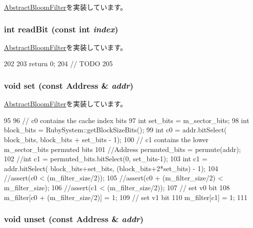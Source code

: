 \hyperlink{classAbstractBloomFilter_a3ea5f7af5db62cc24f4e40df9ea5c971}{AbstractBloomFilter}を実装しています。\hypertarget{classBulkBloomFilter_a6f8a98d0f38a8d122d4cbf87323484eb}{
\subsubsection[{readBit}]{\setlength{\rightskip}{0pt plus 5cm}int readBit (const int {\em index})}}
\label{classBulkBloomFilter_a6f8a98d0f38a8d122d4cbf87323484eb}


\hyperlink{classAbstractBloomFilter_a6c0e9a098f0f210aa42eb2f1553804eb}{AbstractBloomFilter}を実装しています。


\begin{DoxyCode}
202 {
203     return 0;
204     // TODO
205 }
\end{DoxyCode}
\hypertarget{classBulkBloomFilter_a2b666fae2a5c2b98bc5cba8e1333bcc9}{
\subsubsection[{set}]{\setlength{\rightskip}{0pt plus 5cm}void set (const {\bf Address} \& {\em addr})}}
\label{classBulkBloomFilter_a2b666fae2a5c2b98bc5cba8e1333bcc9}


\hyperlink{classAbstractBloomFilter_a54e1262ae5f60efeb8714d0556b3c32e}{AbstractBloomFilter}を実装しています。


\begin{DoxyCode}
95 {
96     // c0 contains the cache index bits
97     int set_bits = m_sector_bits;
98     int block_bits = RubySystem::getBlockSizeBits();
99     int c0 = addr.bitSelect( block_bits, block_bits + set_bits - 1);
100     // c1 contains the lower m_sector_bits permuted bits
101     //Address permuted_bits = permute(addr);
102     //int c1 = permuted_bits.bitSelect(0, set_bits-1);
103     int c1 = addr.bitSelect( block_bits+set_bits, (block_bits+2*set_bits) - 1);
104     //assert(c0 < (m_filter_size/2));
105     //assert(c0 + (m_filter_size/2) < m_filter_size);
106     //assert(c1 < (m_filter_size/2));
107     // set v0 bit
108     m_filter[c0 + (m_filter_size/2)] = 1;
109     // set v1 bit
110     m_filter[c1] = 1;
111 }
\end{DoxyCode}
\hypertarget{classBulkBloomFilter_a69b772787ea61467af679e3aa5406b41}{
\subsubsection[{unset}]{\setlength{\rightskip}{0pt plus 5cm}void unset (const {\bf Address} \& {\em addr})}}
\label{classBulkBloomFilter_a69b772787ea61467af679e3aa5406b41}


